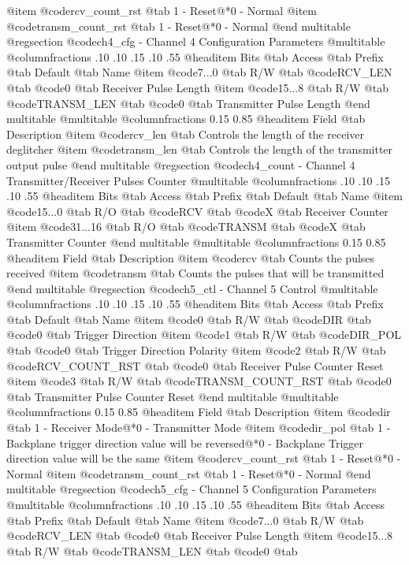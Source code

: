 @item @code{rcv_count_rst} @tab 1 - Reset@*0 - Normal
@item @code{transm_count_rst} @tab 1 - Reset@*0 - Normal
@end multitable
@regsection @code{ch4_cfg} - Channel 4 Configuration Parameters
@multitable @columnfractions .10 .10 .15 .10 .55
@headitem Bits @tab Access @tab Prefix @tab Default @tab Name
@item @code{7...0}
@tab R/W @tab
@code{RCV_LEN}
@tab @code{0} @tab 
Receiver Pulse Length
@item @code{15...8}
@tab R/W @tab
@code{TRANSM_LEN}
@tab @code{0} @tab 
Transmitter Pulse Length
@end multitable
@multitable @columnfractions 0.15 0.85
@headitem Field @tab Description
@item @code{rcv_len} @tab Controls the length of the receiver deglitcher
@item @code{transm_len} @tab Controls the length of the transmitter output pulse
@end multitable
@regsection @code{ch4_count} - Channel 4 Transmitter/Receiver Pulses Counter
@multitable @columnfractions .10 .10 .15 .10 .55
@headitem Bits @tab Access @tab Prefix @tab Default @tab Name
@item @code{15...0}
@tab R/O @tab
@code{RCV}
@tab @code{X} @tab 
Receiver Counter
@item @code{31...16}
@tab R/O @tab
@code{TRANSM}
@tab @code{X} @tab 
Transmitter Counter
@end multitable
@multitable @columnfractions 0.15 0.85
@headitem Field @tab Description
@item @code{rcv} @tab Counts the pulses received
@item @code{transm} @tab Counts the pulses that will be transmitted
@end multitable
@regsection @code{ch5_ctl} - Channel 5 Control
@multitable @columnfractions .10 .10 .15 .10 .55
@headitem Bits @tab Access @tab Prefix @tab Default @tab Name
@item @code{0}
@tab R/W @tab
@code{DIR}
@tab @code{0} @tab 
Trigger Direction
@item @code{1}
@tab R/W @tab
@code{DIR_POL}
@tab @code{0} @tab 
Trigger Direction Polarity
@item @code{2}
@tab R/W @tab
@code{RCV_COUNT_RST}
@tab @code{0} @tab 
Receiver Pulse Counter Reset
@item @code{3}
@tab R/W @tab
@code{TRANSM_COUNT_RST}
@tab @code{0} @tab 
Transmitter Pulse Counter Reset
@end multitable
@multitable @columnfractions 0.15 0.85
@headitem Field @tab Description
@item @code{dir} @tab 1 - Receiver Mode@*0 - Transmitter Mode
@item @code{dir_pol} @tab 1 - Backplane trigger direction value will be reversed@*0 - Backplane Trigger direction value will be the same
@item @code{rcv_count_rst} @tab 1 - Reset@*0 - Normal
@item @code{transm_count_rst} @tab 1 - Reset@*0 - Normal
@end multitable
@regsection @code{ch5_cfg} - Channel 5 Configuration Parameters
@multitable @columnfractions .10 .10 .15 .10 .55
@headitem Bits @tab Access @tab Prefix @tab Default @tab Name
@item @code{7...0}
@tab R/W @tab
@code{RCV_LEN}
@tab @code{0} @tab 
Receiver Pulse Length
@item @code{15...8}
@tab R/W @tab
@code{TRANSM_LEN}
@tab @code{0} @tab 
